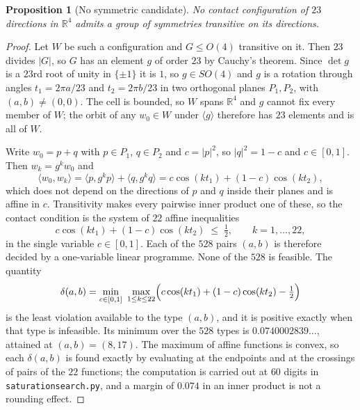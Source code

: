 \documentclass[11pt,reqno]{amsart}
\renewcommand{\_}{\origunderscore\allowbreak}
\numberwithin{equation}{section}
\theoremstyle{plain}
\newtheorem{prop}[thm]{Proposition}
\theoremstyle{definition}
\theoremstyle{remark}
\begin{document}
\begin{prop}[No symmetric candidate]\label{prop:no-transitive}
No contact configuration of $23$ directions in $\mathbb{R}^4$ admits a
group of symmetries transitive on its directions.
\end{prop}

\begin{proof}
Let $W$ be such a configuration and $G\le O(4)$ transitive on it. Then
$23$ divides $|G|$, so $G$ has an element $g$ of order $23$ by Cauchy's
theorem. Since $\det g$ is a $23$rd root of unity in $\{\pm1\}$ it is $1$,
so $g\in SO(4)$ and $g$ is a rotation through angles $t_1=2\pi a/23$ and
$t_2=2\pi b/23$ in two orthogonal planes $P_1,P_2$, with $(a,b)\ne(0,0)$.
The cell is bounded, so $W$ spans $\mathbb{R}^4$ and $g$ cannot fix every
member of $W$; the orbit of any $w_0\in W$ under $\langle g\rangle$
therefore has $23$ elements and is all of $W$.

Write $w_0=p+q$ with $p\in P_1$, $q\in P_2$ and $c=|p|^2$, so $|q|^2=1-c$
and $c\in[0,1]$. Then $w_k=g^kw_0$ and
\[
  \langle w_0,w_k\rangle=\langle p,g^kp\rangle+\langle q,g^kq\rangle
  =c\cos(kt_1)+(1-c)\cos(kt_2),
\]
which does not depend on the directions of $p$ and $q$ inside their planes
and is affine in $c$. Transitivity makes every pairwise inner product one
of these, so the contact condition is the system of $22$ affine
inequalities
\[
  c\cos(kt_1)+(1-c)\cos(kt_2)\;\le\;\tfrac12,\qquad k=1,\dots,22,
\]
in the single variable $c\in[0,1]$. Each of the $528$ pairs $(a,b)$ is
therefore decided by a one-variable linear programme. None of the $528$ is
feasible. The quantity
\[
  \delta(a,b)=\min_{c\in[0,1]}\ \max_{1\le k\le22}
    \Bigl(c\cos(kt_1)+(1-c)\cos(kt_2)-\tfrac12\Bigr)
\]
is the least violation available to the type $(a,b)$, and it is positive
exactly when that type is infeasible. Its minimum over the $528$ types is
$0.0740002839\ldots$, attained at $(a,b)=(8,17)$. The maximum of affine
functions is convex, so each $\delta(a,b)$ is found exactly by evaluating
at the endpoints and at the crossings of pairs of the $22$ functions; the
computation is carried out at $60$ digits in
\texttt{saturation\_search.py}, and a margin of $0.074$ in an inner
product is not a rounding effect.
\end{proof}
\end{document}
